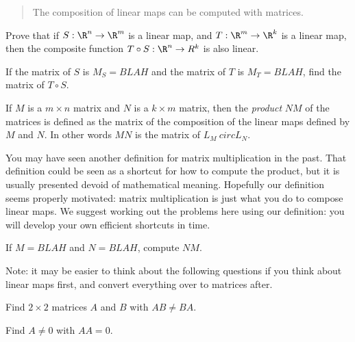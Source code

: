 \documentclass{ximera}
\begin{document}
\begin{abstract}
  The composition of linear maps can be computed with matrices.
\end{abstract}

\begin{question}
  Prove that if $S:\R^n \to \R^m$ is a linear map, and $T:\R^m \to \R^k$ is a linear map, then the composite function $T\circ S:\R^n \to R^k$ is also linear.

  \begin{free-response}
  \end{free-response}
\end{question}
	
\begin{question}
  If the matrix of $S$ is $M_S = BLAH$ and the matrix of $T$ is $M_T = BLAH$, find the matrix of $T \circ S$.
\end{question}
	
\begin{definition}
  If $M$ is a $m\times n$ matrix and $N$ is a $k \times m$ matrix, then the \textit{product} $NM$ of the matrices is
  defined as the matrix of the composition of the linear maps defined by $M$ and $N$.  In other words  $MN$ is the matrix of 
  $L_M\ circ L_N$.
\end{definition}

\begin{warning}
  You may have seen another definition for matrix multiplication in
  the past.  That definition could be seen as a shortcut for how to
  compute the product, but it is usually presented devoid of
  mathematical meaning.  Hopefully our definition seems properly
  motivated: matrix multiplication is just what you do to compose
  linear maps.  We suggest working out the problems here using our
  definition: you will develop your own efficient shortcuts in time.
\end{warning}

\begin{question}
  If $M = BLAH$ and $N=BLAH$, compute $NM$.
\end{question}
	
Note:  it may be easier to think about the following questions if you think about linear maps first, and convert everything over to matrices after.

\begin{question}
  Find $2\times 2$ matrices $A$ and $B$ with $AB \neq BA$.
\end{question}
	
\begin{question}
  Find $A \neq 0$  with $AA = 0$.
\end{question}
	
\end{document}
